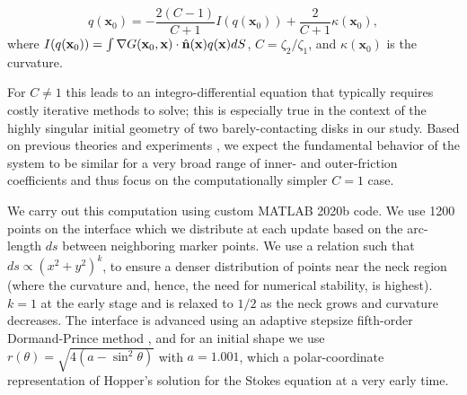 \documentclass[%
reprint,
amsmath,amssymb,
aps,
]{revtex4-2}
\begin{document}
	\begin{equation}
		q(\textbf{x}_0)=-\dfrac{2(C-1)}{C+1}I(q(\textbf{x}_0))+\dfrac{2}{C+1}\kappa(\textbf{x}_0),
	\end{equation}
	where $I(q(\textbf{x}_0))=\int\nabla G({\bf x}_0,{\bf x})\cdot\hat{\bf n}({\bf x})q({\bf x})dS$, $C=\zeta_2/\zeta_1$, and $\kappa(\textbf{x}_0)$ is the curvature.
	
	
	For $C\neq1$ this leads to an integro-differential equation that typically requires costly iterative methods to solve; this is especially true in the context of the highly singular initial geometry of two barely-contacting disks in our study. Based on previous theories and experiments \cite{eggersCoalescenceLiquidDrops1999a,paulsenCoalescenceBubblesDrops2014}, we expect the fundamental behavior of the system to be similar for a very broad range of inner- and outer-friction coefficients and thus focus on the computationally simpler $C=1$ case. 
	
	
	
	We carry out this computation using custom MATLAB 2020b code. We use 1200 points on the interface which we distribute at each update based on the arc-length $ds$ between neighboring marker points. We use a relation such that $ds \propto (x^2+y^2)^k$, to ensure a denser distribution of points near the neck region (where the curvature and, hence, the need for numerical stability, is highest). $k=1$ at the early stage and is relaxed to $1/2$ as the neck grows and curvature decreases. The interface is advanced using an adaptive stepsize fifth-order Dormand-Prince method \cite{press2007numerical}, and for an initial shape we use $r(\theta)=\sqrt{4(a-\sin^2{\theta})}$ with $a=1.001$, which a polar-coordinate representation of Hopper's solution for the Stokes equation \cite{hopperCoalescenceTwoViscous1993} at a very early time. 
	
	
	
\end{document}
